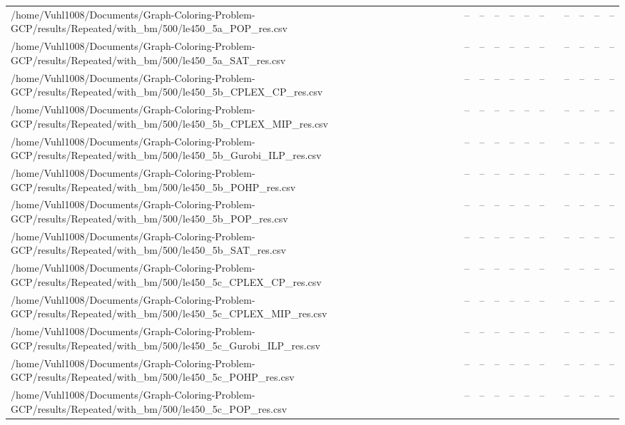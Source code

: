 \begin{table}[htbp]
\begin{tabular}{llllllllllll}
/home/Vuhl1008/Documents/Graph-Coloring-Problem-GCP/results/Repeated/with\_bm/500/le450\_5a\_POP\_res.csv & -- & -- & -- & -- & -- & -- & {} & -- & -- & -- & -- \\
/home/Vuhl1008/Documents/Graph-Coloring-Problem-GCP/results/Repeated/with\_bm/500/le450\_5a\_SAT\_res.csv & -- & -- & -- & -- & -- & -- & {} & -- & -- & -- & -- \\
/home/Vuhl1008/Documents/Graph-Coloring-Problem-GCP/results/Repeated/with\_bm/500/le450\_5b\_CPLEX\_CP\_res.csv & -- & -- & -- & -- & -- & -- & {} & -- & -- & -- & -- \\
/home/Vuhl1008/Documents/Graph-Coloring-Problem-GCP/results/Repeated/with\_bm/500/le450\_5b\_CPLEX\_MIP\_res.csv & -- & -- & -- & -- & -- & -- & {} & -- & -- & -- & -- \\
/home/Vuhl1008/Documents/Graph-Coloring-Problem-GCP/results/Repeated/with\_bm/500/le450\_5b\_Gurobi\_ILP\_res.csv & -- & -- & -- & -- & -- & -- & {} & -- & -- & -- & -- \\
/home/Vuhl1008/Documents/Graph-Coloring-Problem-GCP/results/Repeated/with\_bm/500/le450\_5b\_POHP\_res.csv & -- & -- & -- & -- & -- & -- & {} & -- & -- & -- & -- \\
/home/Vuhl1008/Documents/Graph-Coloring-Problem-GCP/results/Repeated/with\_bm/500/le450\_5b\_POP\_res.csv & -- & -- & -- & -- & -- & -- & {} & -- & -- & -- & -- \\
/home/Vuhl1008/Documents/Graph-Coloring-Problem-GCP/results/Repeated/with\_bm/500/le450\_5b\_SAT\_res.csv & -- & -- & -- & -- & -- & -- & {} & -- & -- & -- & -- \\
/home/Vuhl1008/Documents/Graph-Coloring-Problem-GCP/results/Repeated/with\_bm/500/le450\_5c\_CPLEX\_CP\_res.csv & -- & -- & -- & -- & -- & -- & {} & -- & -- & -- & -- \\
/home/Vuhl1008/Documents/Graph-Coloring-Problem-GCP/results/Repeated/with\_bm/500/le450\_5c\_CPLEX\_MIP\_res.csv & -- & -- & -- & -- & -- & -- & {} & -- & -- & -- & -- \\
/home/Vuhl1008/Documents/Graph-Coloring-Problem-GCP/results/Repeated/with\_bm/500/le450\_5c\_Gurobi\_ILP\_res.csv & -- & -- & -- & -- & -- & -- & {} & -- & -- & -- & -- \\
/home/Vuhl1008/Documents/Graph-Coloring-Problem-GCP/results/Repeated/with\_bm/500/le450\_5c\_POHP\_res.csv & -- & -- & -- & -- & -- & -- & {} & -- & -- & -- & -- \\
/home/Vuhl1008/Documents/Graph-Coloring-Problem-GCP/results/Repeated/with\_bm/500/le450\_5c\_POP\_res.csv & -- & -- & -- & -- & -- & -- & {} & -- & -- & -- & -- \\

\end{tabular}
\end{table}
